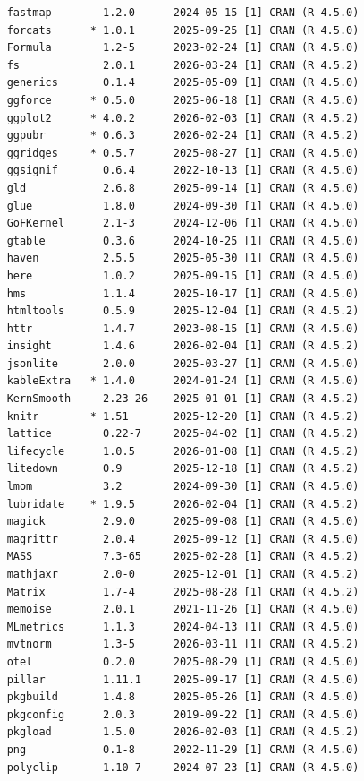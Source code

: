\documentclass[
  11pt,
  a4paper,
]{article}
\begin{document}
\begin{tcolorbox}[enhanced jigsaw, arc=.35mm, bottomrule=.15mm, breakable, colback=white, colframe=quarto-callout-color-frame, left=2mm, leftrule=.75mm, opacityback=0, rightrule=.15mm, toprule=.15mm]
\begin{verbatim}
    fastmap        1.2.0      2024-05-15 [1] CRAN (R 4.5.0)
    forcats      * 1.0.1      2025-09-25 [1] CRAN (R 4.5.0)
    Formula        1.2-5      2023-02-24 [1] CRAN (R 4.5.0)
    fs             2.0.1      2026-03-24 [1] CRAN (R 4.5.2)
    generics       0.1.4      2025-05-09 [1] CRAN (R 4.5.0)
    ggforce      * 0.5.0      2025-06-18 [1] CRAN (R 4.5.0)
    ggplot2      * 4.0.2      2026-02-03 [1] CRAN (R 4.5.2)
    ggpubr       * 0.6.3      2026-02-24 [1] CRAN (R 4.5.2)
    ggridges     * 0.5.7      2025-08-27 [1] CRAN (R 4.5.0)
    ggsignif       0.6.4      2022-10-13 [1] CRAN (R 4.5.0)
    gld            2.6.8      2025-09-14 [1] CRAN (R 4.5.0)
    glue           1.8.0      2024-09-30 [1] CRAN (R 4.5.0)
    GoFKernel      2.1-3      2024-12-06 [1] CRAN (R 4.5.0)
    gtable         0.3.6      2024-10-25 [1] CRAN (R 4.5.0)
    haven          2.5.5      2025-05-30 [1] CRAN (R 4.5.0)
    here           1.0.2      2025-09-15 [1] CRAN (R 4.5.0)
    hms            1.1.4      2025-10-17 [1] CRAN (R 4.5.0)
    htmltools      0.5.9      2025-12-04 [1] CRAN (R 4.5.2)
    httr           1.4.7      2023-08-15 [1] CRAN (R 4.5.0)
    insight        1.4.6      2026-02-04 [1] CRAN (R 4.5.2)
    jsonlite       2.0.0      2025-03-27 [1] CRAN (R 4.5.0)
    kableExtra   * 1.4.0      2024-01-24 [1] CRAN (R 4.5.0)
    KernSmooth     2.23-26    2025-01-01 [1] CRAN (R 4.5.2)
    knitr        * 1.51       2025-12-20 [1] CRAN (R 4.5.2)
    lattice        0.22-7     2025-04-02 [1] CRAN (R 4.5.2)
    lifecycle      1.0.5      2026-01-08 [1] CRAN (R 4.5.2)
    litedown       0.9        2025-12-18 [1] CRAN (R 4.5.2)
    lmom           3.2        2024-09-30 [1] CRAN (R 4.5.0)
    lubridate    * 1.9.5      2026-02-04 [1] CRAN (R 4.5.2)
    magick         2.9.0      2025-09-08 [1] CRAN (R 4.5.0)
    magrittr       2.0.4      2025-09-12 [1] CRAN (R 4.5.0)
    MASS           7.3-65     2025-02-28 [1] CRAN (R 4.5.2)
    mathjaxr       2.0-0      2025-12-01 [1] CRAN (R 4.5.2)
    Matrix         1.7-4      2025-08-28 [1] CRAN (R 4.5.2)
    memoise        2.0.1      2021-11-26 [1] CRAN (R 4.5.0)
    MLmetrics      1.1.3      2024-04-13 [1] CRAN (R 4.5.0)
    mvtnorm        1.3-5      2026-03-11 [1] CRAN (R 4.5.2)
    otel           0.2.0      2025-08-29 [1] CRAN (R 4.5.0)
    pillar         1.11.1     2025-09-17 [1] CRAN (R 4.5.0)
    pkgbuild       1.4.8      2025-05-26 [1] CRAN (R 4.5.0)
    pkgconfig      2.0.3      2019-09-22 [1] CRAN (R 4.5.0)
    pkgload        1.5.0      2026-02-03 [1] CRAN (R 4.5.2)
    png            0.1-8      2022-11-29 [1] CRAN (R 4.5.0)
    polyclip       1.10-7     2024-07-23 [1] CRAN (R 4.5.0)

\end{verbatim}
\end{tcolorbox}
\end{document}
